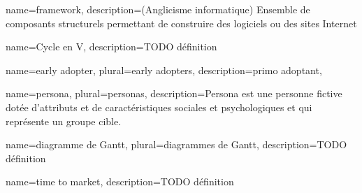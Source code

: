 
\begin{comment}
Glossaire : 
  Nouvelle entrée :
    \newglossaryentry{test} %
    {%
        name={test}, %
        description={<description>}, %
        plural={tests} %
    }
  Usage : 
    \gls{test} Retourne "test"
    \Gls{test} Retourne "Test"
    \glsplural{test} Retourne "tests"
    \Glsplural{test} Retourne "Tests"
        
Pour des mots utilisés fréquemment, petite astuce : 
	\newcommand{\bsr}{bilan scientifique régional} 
Ensuite, dans le contenu, il suffit d'y faire référence comme ceci : "\bsr{}"
\end{comment}


{%
    name={framework},
    description={(Anglicisme informatique) Ensemble de composants structurels permettant de construire des logiciels ou des sites Internet}
}

{%
	name={Cycle en V},
	description={TODO définition}
}

{%
	name={early adopter},
	plural={early adopters},
	description={primo adoptant},
}

{
	name={persona},
	plural={personas},
	description={Persona est une personne fictive dotée d'attributs et de caractéristiques sociales et psychologiques et qui représente un groupe cible. }
}

{
	name={diagramme de Gantt},
	plural={diagrammes de Gantt},
	description={TODO définition}
}

{
	name={time to market},
	description={TODO définition}
}





